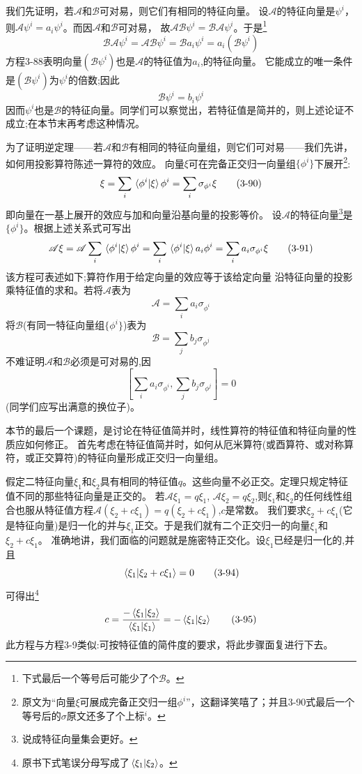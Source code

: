 我们先证明，若$\mathscr{A}$和$\mathscr{B}$可对易，则它们有相同的特征向量。
设$\mathscr{A}$的特征向量是$\psi^i$，则$\mathscr{A}\psi^i=a_i\psi^i$。而因$\mathscr{A}$和$\mathscr{B}$可对易，
故$\mathscr{A}\mathscr{B}\psi^i=\mathscr{B}\mathscr{A}\psi^i$。于是\footnote{下式最后一个等号后可能少了个$\mathscr{B}$。}
\[\mathscr{B}\mathscr{A}\psi^i=\mathscr{A}\mathscr{B}\psi^i=\mathscr{B}a_i\psi^i=a_i(\mathscr{B}\psi^i) \tag{3-88}\]
方程3-88表明向量$(\mathscr{B}\psi^i)$也是$\mathscr{A}$的特征值为$a_i$,的特征向量。
它能成立的唯一条件是$(\mathscr{B}\psi^i)$为$\psi^i$的倍数;因此
\[\mathscr{B}\psi^i=b_i\psi^i \tag{3-89}\]
因而$\psi^i$也是$\mathscr{B}$的特征向量。同学们可以察觉出，若特征值是简并的，则上述论证不成立;在本节末再考虑这种情况。

为了证明逆定理——若$\mathscr{A}$和$\mathscr{B}$有相同的特征向量组，则它们可对易——我们先讲，如何用投影算符陈述一算符的效应。
向量$\xi$可在完备正交归一向量组$\{\phi^i\}$下展开\footnote{原文为“向量$\xi$可展成完备正交归一组$\phi^i$”，这翻译笑嘻了；并且3-90式最后一个等号后的$\sigma$原文还多了个上标$^i$。}:
\[\xi=\sum_i\bra*{\phi^i}\ket*{\xi}\phi^i=\sum_i\sigma_{\phi^i}\xi \tag{3-90}\]
即向量在一基上展开的效应与加和向量沿基向量的投影等价。
设$\mathscr{A}$的特征向量\footnote{说成特征向量集会更好。}是$\{\phi^i\}$。根据上述关系式可写出
\[\mathscr{A}\xi=\mathscr{A}\sum_i\bra*{\phi^i}\ket*{\xi}\phi^i=\sum_i\bra*{\phi^i}\ket*{\xi}a_i\phi^i=\sum_ia_i\sigma_{\phi^i}\xi \tag{3-91}\]
该方程可表述如下;算符作用于给定向量的效应等于该给定向量
沿特征向量的投影乘特征值的求和。若将$\mathscr{A}$表为
\[\mathscr{A}=\sum_ia_i\sigma_{\phi^i} \tag{3-91}\]
将$\mathscr{B}$(有同一特征向量组$\{\phi^i\}$)表为
\[\mathscr{B}=\sum_jb_j\sigma_{\phi^j} \tag{3-92}\]
不难证明$\mathscr{A}$和$\mathscr{B}$必须是可对易的,因
\[\left[\sum_ia_i\sigma_{\phi^i},\sum_jb_j\sigma_{\phi^j}\right]=0\]
(同学们应写出满意的换位子)。

本节的最后一个课题，是讨论在特征值简并时，线性算符的特征值和特征向量的性质应如何修正。
首先考虑在特征值简并时，如何从厄米算符(或酉算符、或对称算符，或正交算符)的特征向量形成正交归一向量组。

假定二特征向量$\xi_1$和$\xi_2$具有相同的特征值$q$。这些向量不必正交。定理只规定特征值不同的那些特征向量是正交的。
若$\mathscr{A}\xi_1=q\xi_1$, $\mathscr{A}\xi_2=q\xi_2$,则$\xi_1$和$\xi_2$的任何线性组合也服从特征值方程$\mathscr{A}(\xi_2+c\xi_1)=q(\xi_2+c\xi_1)$,$c$是常数。
我们要求$\xi_2+c\xi_1$(它是特征向量)是归一化的并与$\xi_1$正交。于是我们就有二个正交归一的向量$\xi_1$和$\xi_2+c\xi_1$。
准确地讲，我们面临的问题就是施密特正交化。设$\xi_1$已经是归一化的,并且
\[\bra*{\xi_1}\ket*{\xi_2+c\xi_1}=0 \tag{3-94}\]
可得出\footnote{原书下式笔误分母写成了$\bra*{\xi_1}\ket*{\xi_2}$。}
\[c=\frac{-\bra*{\xi_1}\ket*{\xi_2}}{\bra*{\xi_1}\ket*{\xi_1}}=-\bra*{\xi_1}\ket*{\xi_2} \tag{3-95}\]
此方程与方程3-9类似:可按特征值的简件度的要求，将此步骤面复进行下去。

